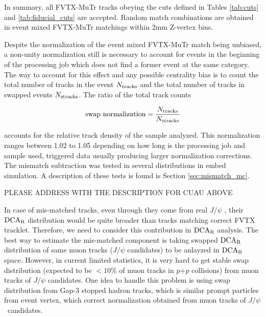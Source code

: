 \documentclass[12pt]{article}
\newcommand{\jpsi}{$J/\psi$ }
\newcommand{\dcar}{$\rm{DCA}_{R}$ }
\newcommand{\pp}{$p$+$p$ }
\begin{document}
In summary, all  FVTX-MuTr tracks obeying the cuts defined in Tables \ref{tab:cuts} and \ref{tab:fiducial_cuts} are accepted. Random match combinations 
are obtained in event mixed FVTX-MuTr matchings within 2mm Z-vertex bins.

Despite the normalization of the event mixed FVTX-MuTr match being unbiased, a non-unity normalization still is necessary to account for events in the beginning 
of the processing job which does not find a former event at the same category. The way to account for this effect and any possible centrality bias is to count the
 total number of tracks in the event $N_{\rm tracks}$ and the total number of tracks in swapped events $N_{\rm stracks}$. The ratio of the total track counts

\begin{equation}
\label{eq:swap_norm}
   \textrm{swap normalization} = \frac{N_{\rm tracks}}{N_{\rm stracks}}
\end{equation}

\noindent accounts for the relative track density of the sample analyzed. This normalization ranges between 1.02 to 1.05 depending on how long is the processing 
job and sample used,  triggered data usually producing larger normalization corrections. The mismatch subtraction was tested in several distributions in embed simulation. A description of these tests is found is Section \ref{sec:mismatch_mc}.

{\color{red} PLEASE ADDRESS WITH THE DESCRIPTION FOR CUAU ABOVE\\}

In case of mis-matched tracks, even through they come from real \jpsi, their \dcar distribution would be quite broader than tracks matching correct FVTX tracklet.
Therefore, we need to consider this contribution in \dcar analysis.
The best way to estimate the mis-matched component is taking swapped \dcar distribution of same muon tracks (\jpsi candidates) to be anlayzed in \dcar space.
However, in current limited statistics, it is very hard to get stable swap distribution (expected to be $<10\%$ of muon tracks in \pp collisions) from muon tracks of \jpsi candidates.
One idea to handle this problem is using swap distribution from Gap-3 stopped hadron tracks, which is similar prompt particles from event vertex, which correct normalization obtained from muon tracks of \jpsi\ candidates.
\end{document}
